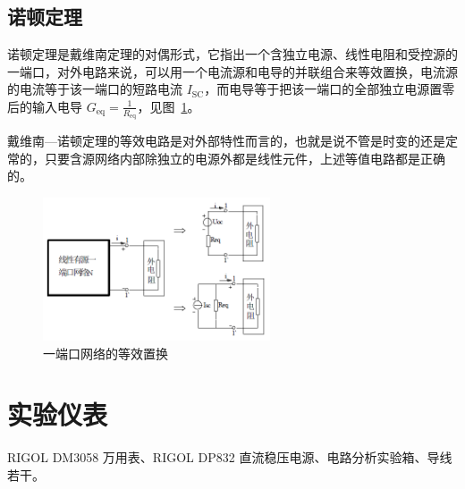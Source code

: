 \documentclass[a4paper,utf8]{article}
\begin{document}
\subsection{诺顿定理}
诺顿定理是戴维南定理的对偶形式，它指出一个含独立电源、线性电阻和受控源的一端口，对外电路来说，可以用一个电流源和电导的并联组合来等效置换，电流源的电流等于该一端口的短路电流 $I_\text{SC}$，而电导等于把该一端口的全部独立电源置零后的输入电导 $G_\text{eq}=\frac{1}{R_\text{eq}}$，见图~\ref{fig:a}。\par
戴维南—诺顿定理的等效电路是对外部特性而言的，也就是说不管是时变的还是定常的，只要含源网络内部除独立的电源外都是线性元件，上述等值电路都是正确的。
\begin{figure}[!ht]
    \caption{一端口网络的等效置换\label{fig:a}}
    \includegraphics[width=0.6\textwidth]{1.png}
\end{figure}

\section{实验仪表}
    RIGOL DM3058 万用表、RIGOL DP832 直流稳压电源、电路分析实验箱、导线若干。
\end{document}
